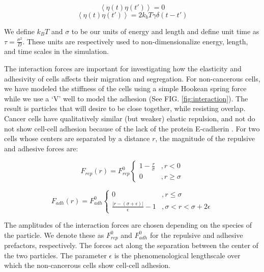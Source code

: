 \documentclass[aps,prb,twocolumn,groupedaddress,nofootinbib,floatfix]{revtex4}
\begin{document}
\begin{equation}
\left\langle \eta(t)\eta(t')\right\rangle = 0 
\end{equation}
\begin{equation}
\left\langle \eta(t)\eta(t')\right\rangle = 2k_bT\gamma
\delta(t-t')
\end{equation}


We define $k_BT$ and $\sigma$ to be our units of energy and length and define 
unit time as $\tau = \frac{\sigma^2}{D}$. These units are respectively used to non-dimensionalize 
energy, length, and time scales in the simulation. 


The interaction forces are important for investigating how the elasticity and adhesivity of cells affects their migration and segregation. For non-cancerous cells, 
we have modeled the stiffness of the cells using a simple Hookean spring force while we use a `V' well to model the adhesion (See FIG. \ref{fig:interaction}). 
The result is particles that will desire to be close together, while resisting overlap. Cancer cells have qualitatively similar (but weaker) elastic repulsion, and not do not show 
cell-cell adhesion because of the lack of the protein E-cadherin \cite{Jeanes}. For two cells whose centers are separated by a distance $r$, the magnitude of the repulsive and adhesive forces are:

\begin{equation}
  F_{rep}(r) = F^0_{rep} \left\{ 
    \begin{array}{lr}
      1-\frac{r}{\sigma} &, r < 0\\
      0 &, r \ge \sigma
    \end{array}
  \right.
  \label{eq:frep}
\end{equation}

\begin{equation}
  F_{adh}(r) =F^0_{adh} \left\{
    \begin{array}{lr}
      0 &, r \le \sigma \\
      \frac{|r - (\sigma+\epsilon)|}{\epsilon}-1 &, \sigma < r < \sigma+2\epsilon
    \end{array}
  \right.
  \label{eq:fadh}
\end{equation}

The amplitudes of the interaction forces are chosen depending on the species of the particle. We denote these as $F^0_{rep}$ and $F^0_{adh}$ for the repulsive and adhesive prefactors, respectively.
The forces act along the separation between the center of the two particles. 
The parameter $\epsilon$ is the phenomenological lengthscale over which the non-cancerous cells show cell-cell adhesion. 
\end{document}

